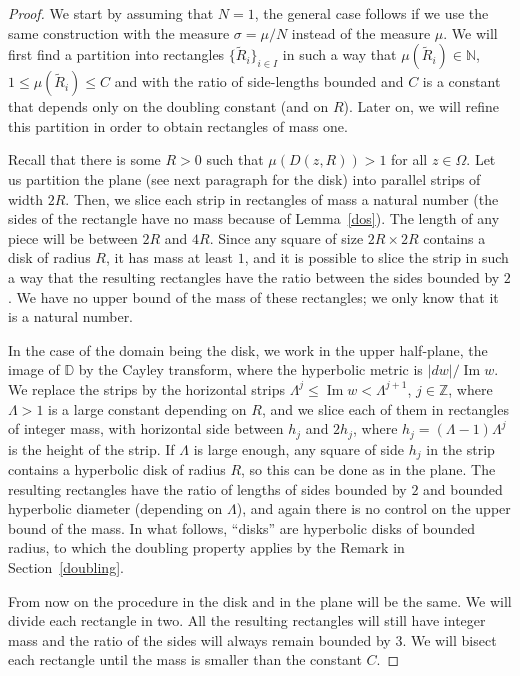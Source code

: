 \documentclass[12pt,twoside,final,psamsfonts]{amsart}
\theoremstyle{plain}
\theoremstyle{remark}
\theoremstyle{definition}
\newcommand{\N}{{\mathbb N}}
\newcommand{\D}{{\mathbb D}}
\renewcommand{\Im}{\operatorname{Im}}
\begin{document}
\begin{proof}
We start by assuming that $N=1$, the general case follows if we use the same
construction with the measure $\sigma=\mu/N$ instead of the measure $\mu$. We
will first find a partition into rectangles $\{\widetilde R_i\}_{i\in I}$ in
such a way that $\mu(\widetilde R_i)\in \N$, $1\le\mu(\widetilde R_i)\le C$ 
and with the ratio of side-lengths bounded
and $C$ is a constant that depends only on the doubling constant (and on
$R$). Later on, we will refine this
partition in order to obtain rectangles of mass one.

Recall that there is some $R>0$ such that $\mu(D(z,R))>1$ for all $z\in\Omega$.
Let us partition the plane (see next paragraph for the disk)
into parallel strips of width $2R$. Then, we
slice each strip in rectangles of mass a natural number (the sides of the
rectangle have no mass because of Lemma~\ref{dos}).
The length of any piece will be between $2R$ and $4R$.
Since any square of size $2R\times 2R$ contains a disk of radius $R$, it has
mass at
least $1$, and it is possible to slice the strip in such a way that the
resulting rectangles have the ratio between the sides bounded by $2$.
We have no upper bound of the mass of these rectangles;
we only know that it is a natural number.

In the case of the domain being the disk, we work in the upper half-plane,
the image of $\D$ by the Cayley transform, where the hyperbolic metric is
$|dw|/\Im w$. We replace the strips by the horizontal strips
$\Lambda^j\le \Im w<\Lambda^{j+1}$, $j\in\mathbb Z$, where $\Lambda>1$ is a large
constant depending on $R$, and we slice each of them in rectangles of
integer mass, with horizontal side between $h_j$ and $2h_j$, where
$h_j=(\Lambda-1)\Lambda^j$ is the height of the strip. If $\Lambda$ is large
enough, any square of side $h_j$ in the strip contains a hyperbolic disk of
radius $R$, so this can be done as in the plane.
The resulting rectangles have the ratio of lengths of
sides bounded by $2$ and bounded hyperbolic diameter (depending on
$\Lambda$), and again there is no control on the upper bound of the mass. In
what follows, ``disks'' are hyperbolic disks of bounded radius, to which the
doubling property applies by the Remark in Section~\ref{doubling}.


From now on the procedure in the disk and in the plane will be the same. 
We will divide each rectangle in two. All the resulting rectangles will still
have
integer mass and the ratio of the sides will always remain
bounded by $3$. We will
bisect each rectangle until the mass is smaller than the
constant $C$.


\end{proof}
\end{document}
